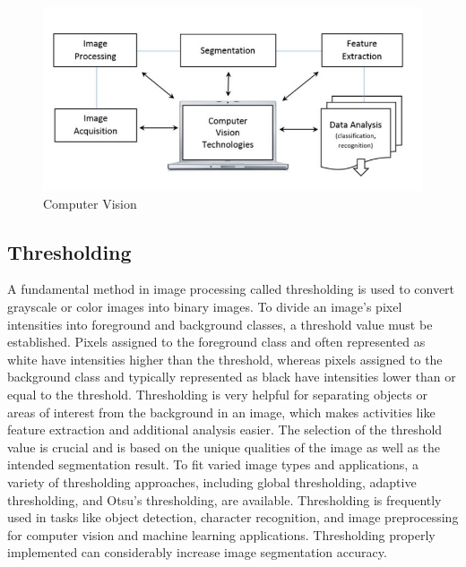\documentclass[a4paper,12pt]{report}%
\renewcommand{\\}{\vspace*{0.5\baselineskip} \newline}
\begin{document}
\begin{figure}[h]
\centering
	\includegraphics[scale=1.0]{images/image processing.png}\\
	\begin{footnotesize}
		\caption{Computer Vision \cite{15}}
		\label{Computer Vision}
	\end{footnotesize}
\end{figure}





\subsection{Thresholding}
A fundamental method in image processing called thresholding is used to convert grayscale or color images into binary images. To divide an image's pixel intensities into foreground and background classes, a threshold value must be established. Pixels assigned to the foreground class and often represented as white have intensities higher than the threshold, whereas pixels assigned to the background class and typically represented as black have intensities lower than or equal to the threshold. Thresholding is very helpful for separating objects or areas of interest from the background in an image, which makes activities like feature extraction and additional analysis easier. The selection of the threshold value is crucial and is based on the unique qualities of the image as well as the intended segmentation result.
To fit varied image types and applications, a variety of thresholding approaches, including global thresholding, adaptive thresholding, and Otsu's thresholding, are available. Thresholding is frequently used in tasks like object detection, character recognition, and image preprocessing for computer vision and machine learning applications. Thresholding properly implemented can considerably increase image segmentation accuracy.
\end{document}
